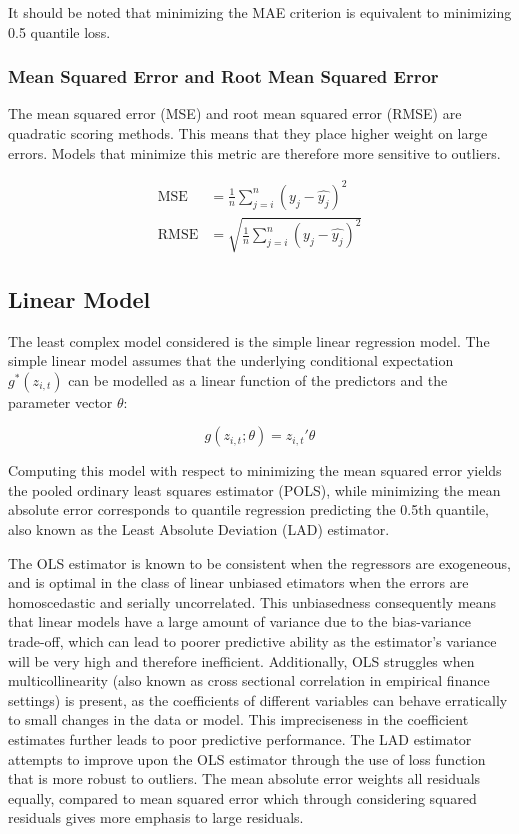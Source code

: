 \documentclass[a4paper, table]{article}
\begin{document}
It should be noted that minimizing the MAE criterion is equivalent to minimizing 0.5 quantile loss.

\subsubsection{Mean Squared Error and Root Mean Squared Error}

The mean squared error (MSE) and root mean squared error (RMSE) are quadratic scoring methods. This means that they place higher weight on large errors. Models that minimize this metric are therefore more sensitive to outliers. 

\begin{align}
	\text{MSE} &= \frac{1}{n} \sum_{j = i}^{n} \left( y_j - \hat{y_j}\right) ^2 \\
	\text{RMSE} &= \sqrt{ \frac{1}{n} \sum_{j = i}^{n} \left( y_j - \hat{y_j}\right) ^2}
\end{align}

\subsection{Linear Model}

The least complex model considered is the simple linear regression model. The simple linear model assumes that the underlying conditional expectation \( g^*(z_{i, t}) \) can be modelled as a linear function of the predictors and the parameter vector \( \theta \):

\begin{equation}
	g(z_{i, t};\theta) = z_{i, t}' \theta
\end{equation} 

Computing this model with respect to minimizing the mean squared error yields the pooled ordinary least squares estimator (POLS), while minimizing the mean absolute error corresponds to quantile regression predicting the 0.5th quantile, also known as the Least Absolute Deviation (LAD) estimator. 

The OLS estimator is known to be consistent when the regressors are exogeneous, and is optimal in the class of linear unbiased etimators when the errors are homoscedastic and serially uncorrelated. This unbiasedness consequently means that linear models have a large amount of variance due to the bias-variance trade-off, which can lead to poorer predictive ability as the estimator's variance will be very high and therefore inefficient. Additionally, OLS struggles when multicollinearity (also known as cross sectional correlation in empirical finance settings) is present, as the coefficients of different variables can behave erratically to small changes in the data or model. This impreciseness in the coefficient estimates further leads to poor predictive performance. The LAD estimator attempts to improve upon the OLS estimator through the use of loss function that is more robust to outliers. The mean absolute error weights all residuals equally, compared to mean squared error which through considering squared residuals gives more emphasis to large residuals. 
\end{document}
